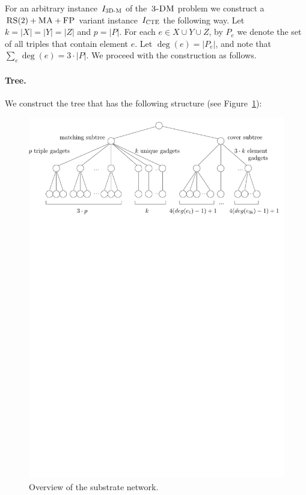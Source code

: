  For an arbitrary instance~$I_{\mathrm{\textsc{3D-M}}}$ of the~$\textsc{3-DM}$ problem we construct a~$\textsc{RS}(2)+\textsc{MA}+\textsc{FP}$ variant instance~$I_{\mathrm{\textsc{CTE}}}$ the following way.
Let $k = |X|=|Y|=|Z|$ and $p = |P|$.
For each $e\in X\cup Y\cup Z$, by $P_e$ we denote the set of all triples that contain element $e$.
Let $\deg(e) = |P_e|$, and note that $\sum_e \deg(e) = 3\cdot |P|$.
We proceed with the construction as follows.

\paragraph{Tree.}
We construct the tree that has the following structure (see Figure~\ref{fig:red-ma2}):

\begin{figure}[t]
  \centering
  \includegraphics[width=0.9\columnwidth]{figs/static-mapping/overview}
  \caption{Overview of the substrate network.}
  \label{fig:red-ma2}
\end{figure}

